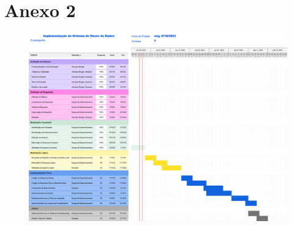 \documentclass[a4paper,12pt]{scrreprt}
\begin{document}
    \section{Anexo 2} \label{GANTT_c2}
        \begin{figure}[h]
            \centering
            \includegraphics[width=6.2in]{images/GANTT_c2.png}
        \end{figure}


\end{document}
